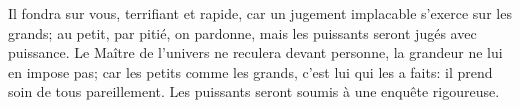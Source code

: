 Il fondra sur vous, terrifiant et rapide,
	car un jugement implacable s’exerce sur les grands;
	au petit, par pitié, on pardonne,
	mais les puissants seront jugés avec puissance.
Le Maître de l’univers ne reculera devant personne, la grandeur ne lui en impose pas;
	car les petits comme les grands, c’est lui qui les a faits:
	il prend soin de tous pareillement.
Les puissants seront soumis à une enquête rigoureuse.
